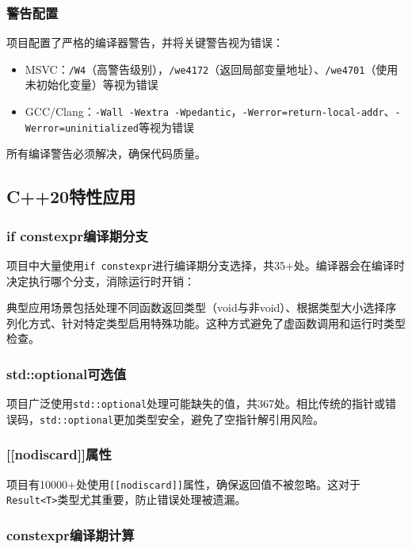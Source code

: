 \subsubsection{警告配置}

项目配置了严格的编译器警告，并将关键警告视为错误：

\begin{itemize}
    \item MSVC：\texttt{/W4}（高警告级别），\texttt{/we4172}（返回局部变量地址）、\texttt{/we4701}（使用未初始化变量）等视为错误
    \item GCC/Clang：\texttt{-Wall -Wextra -Wpedantic}，\texttt{-Werror=return-local-addr}、\texttt{-Werror=uninitialized}等视为错误
\end{itemize}

所有编译警告必须解决，确保代码质量。

\subsection{C++20特性应用}

\subsubsection{if constexpr编译期分支}

项目中大量使用\texttt{if constexpr}进行编译期分支选择，共35+处。编译器会在编译时决定执行哪个分支，消除运行时开销：

典型应用场景包括处理不同函数返回类型（void与非void）、根据类型大小选择序列化方式、针对特定类型启用特殊功能。这种方式避免了虚函数调用和运行时类型检查。

\subsubsection{std::optional可选值}

项目广泛使用\texttt{std::optional}处理可能缺失的值，共367处。相比传统的指针或错误码，\texttt{std::optional}更加类型安全，避免了空指针解引用风险。

\subsubsection{[[nodiscard]]属性}

项目有10000+处使用\texttt{[[nodiscard]]}属性，确保返回值不被忽略。这对于\texttt{Result<T>}类型尤其重要，防止错误处理被遗漏。

\subsubsection{constexpr编译期计算}

